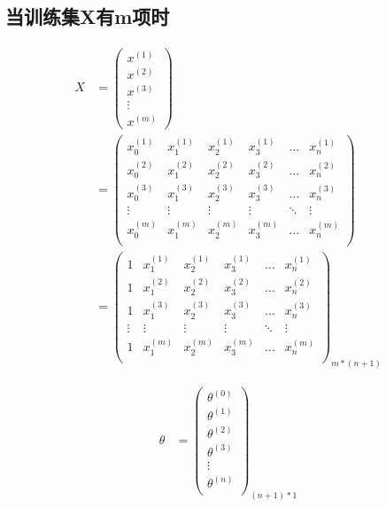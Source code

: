 \subsection{当训练集X有m项时}
\begin{equation} \begin{aligned}
	X & = \left(\begin{matrix}
			x^{(1)} \\ x^{(2)} \\ x^{(3)} \\ \vdots \\ x^{(m)}
		\end{matrix}\right) \\
	& = \left( \begin{matrix}
			x_0^{(1)} & x_1^{(1)} & x_2^{(1)} & x_3^{(1)} & \dots & x_n^{(1)} \\
			x_0^{(2)} & x_1^{(2)} & x_2^{(2)} & x_3^{(2)} & \dots & x_n^{(2)} \\
			x_0^{(3)} & x_1^{(3)} & x_2^{(3)} & x_3^{(3)} & \dots & x_n^{(3)} \\
			\vdots    & \vdots    & \vdots    & \vdots    & \ddots & \vdots   \\
			x_0^{(m)} & x_1^{(m)} & x_2^{(m)} & x_3^{(m)} & \dots & x_n^{(m)} \\
			\end{matrix}\right) \\
	& = \left(\begin{matrix}
			1 & x_1^{(1)} & x_2^{(1)} & x_3^{(1)} & \dots & x_n^{(1)} \\
			1 & x_1^{(2)} & x_2^{(2)} & x_3^{(2)} & \dots & x_n^{(2)} \\
			1 & x_1^{(3)} & x_2^{(3)} & x_3^{(3)} & \dots & x_n^{(3)} \\
			\vdots    & \vdots    & \vdots    & \vdots    & \ddots & \vdots   \\
			1 & x_1^{(m)} & x_2^{(m)} & x_3^{(m)} & \dots & x_n^{(m)} \\
		\end{matrix}\right)_{m*(n+1)}
\end{aligned} \end{equation}


\begin{equation} \begin{aligned}
	\theta & = \left(\begin{matrix}
			\theta^{(0)} \\ \theta^{(1)} \\ \theta^{(2)} \\ \theta^{(3)} \\ \vdots \\ \theta^{(n)} \\
		\end{matrix}\right)_{(n+1)*1}
\end{aligned}\end{equation}

